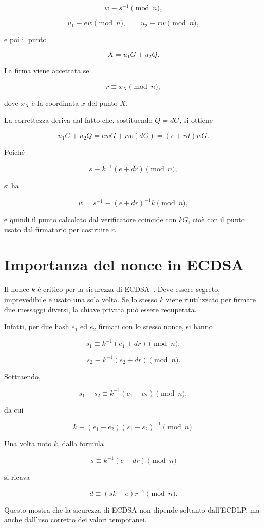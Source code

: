 \documentclass[12pt,a4paper,oneside]{report}
\begin{document}
\[
w\equiv s^{-1}\pmod n,
\]

\[
u_1\equiv ew\pmod n,
\qquad
u_2\equiv rw\pmod n,
\]

e poi il punto

\[
X=u_1G+u_2Q.
\]

La firma viene accettata se

\[
r\equiv x_X \pmod n,
\]

dove \(x_X\) è la coordinata \(x\) del punto \(X\).

La correttezza deriva dal fatto che, sostituendo \(Q=dG\), si ottiene

\[
u_1G+u_2Q = ewG+rw(dG)=(e+rd)wG.
\]

Poiché

\[
s\equiv k^{-1}(e+dr)\pmod n,
\]

si ha

\[
w=s^{-1}\equiv (e+dr)^{-1}k \pmod n,
\]

e quindi il punto calcolato dal verificatore coincide con \(kG\), cioè con il punto usato dal firmatario per costruire \(r\).

\section{Importanza del nonce in ECDSA}

Il nonce \(k\) è critico per la sicurezza di ECDSA~\cite{fips_186_5}. Deve essere segreto, imprevedibile e usato una sola volta. Se lo stesso \(k\) viene riutilizzato per firmare due messaggi diversi, la chiave privata può essere recuperata.

Infatti, per due hash \(e_1\) ed \(e_2\) firmati con lo stesso nonce, si hanno

\[
s_1 \equiv k^{-1}(e_1+dr)\pmod n,
\]

\[
s_2 \equiv k^{-1}(e_2+dr)\pmod n.
\]

Sottraendo,

\[
s_1-s_2\equiv k^{-1}(e_1-e_2)\pmod n,
\]

da cui

\[
k\equiv (e_1-e_2)(s_1-s_2)^{-1}\pmod n.
\]

Una volta noto \(k\), dalla formula

\[
s\equiv k^{-1}(e+dr)\pmod n
\]

si ricava

\[
d\equiv (sk-e)r^{-1}\pmod n.
\]

Questo mostra che la sicurezza di ECDSA non dipende soltanto dall'ECDLP, ma anche dall'uso corretto dei valori temporanei.
\end{document}
